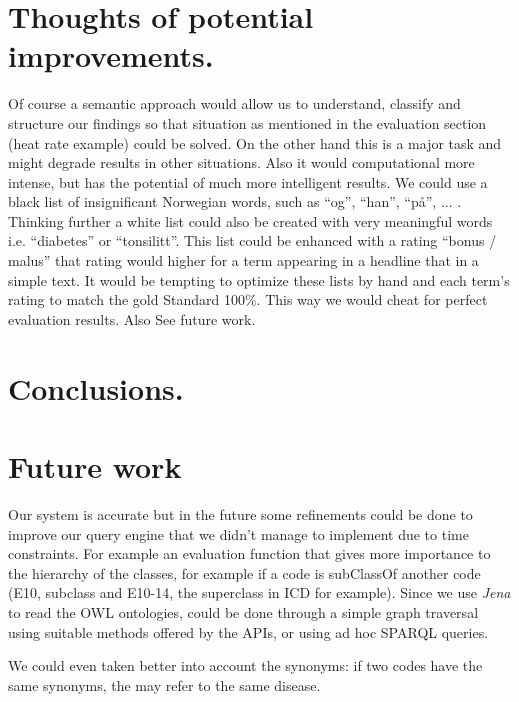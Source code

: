 \documentclass{article}
\begin{document}
\section{Thoughts of potential improvements.}
Of course a semantic approach would allow us to understand, classify and structure our findings so that situation as mentioned in the evaluation section (heat rate example) could be solved. On the other hand this is a major task and might degrade results in other situations. Also it would computational more intense, but has the potential of much more intelligent results.
We could use a black list of insignificant Norwegian words, such as "`og"', "`han"', "`på"', ... . Thinking further a white list could also be created with very meaningful words i.e. "`diabetes"' or "`tonsilitt"'. This list could be enhanced with a rating "`bonus / malus"' that rating would higher for a term appearing in a headline that in a simple text. It would be tempting to optimize these lists by hand and each term's rating to match the gold Standard 100\%. This way we would cheat for perfect evaluation results. Also See future work. 
\section{Conclusions.}

\section{Future work}
Our system is accurate but in the future some refinements could be done to improve our query engine that we didn't manage to implement due to time constraints. For example an evaluation function that gives more  importance to the hierarchy of the classes, for example if a code is subClassOf another code (E10, subclass and E10-14, the superclass in ICD for example). Since we use \emph{Jena} to read the OWL ontologies, could be done through a simple graph traversal using suitable methods offered by the APIs, or using ad hoc SPARQL queries.

We could even taken better into account the synonyms: if two codes have the same synonyms, the may refer to the same disease.
\end{document}
